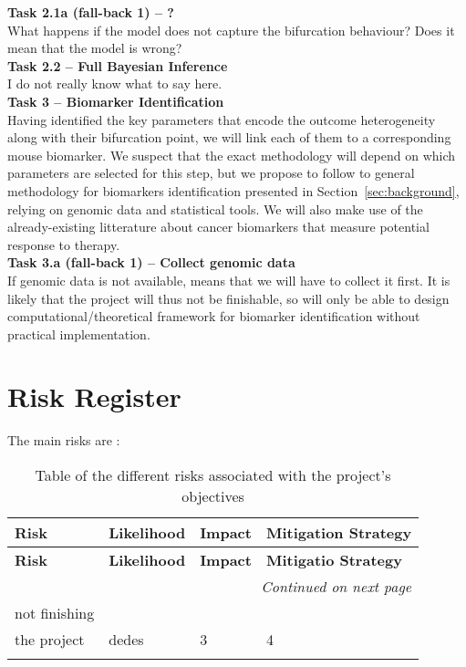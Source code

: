 \documentclass[11pt]{article}
\begin{document}
%
\noindent\textbf{Task 2.1a (fall-back 1) -- ?}\\ 
What happens if the model does not capture the bifurcation behaviour? Does it mean that the model is wrong? \\[12pt]
%
\noindent\textbf{Task 2.2 -- Full Bayesian Inference}\\ 
I do not really know what to say here.\\[12pt]
%
\noindent\textbf{Task 3 -- Biomarker Identification}\\ 
Having identified the key parameters that encode the outcome heterogeneity along with their bifurcation point, we will link each of them to a corresponding mouse biomarker. We suspect that the exact methodology will depend on which parameters are selected for this step, but we propose to follow to general methodology for biomarkers identification presented in Section~\ref{sec:background}, relying on genomic data and statistical tools. We will also make use of the already-existing litterature about cancer biomarkers that measure potential response to therapy. \\[11pt]
%
\noindent\textbf{Task 3.a (fall-back 1) -- Collect genomic data}\\ 
If genomic data is not available, means that we will have to collect it first. It is likely that the project will thus not be finishable, so will only be able to design computational/theoretical framework for biomarker identification without practical implementation.  

\section{Risk Register}
The main risks are : 

\begin{longtable}{|p{3.5cm}|p{2.5cm}|p{4.5cm}|p{5cm}|}
    \hline
    \textbf{Risk} & \textbf{Likelihood} & \textbf{Impact} & \textbf{Mitigation Strategy}\\
    \hline
    \endfirsthead
    \hline
    \textbf{Risk} & \textbf{Likelihood} & \textbf{Impact} & \textbf{Mitigatio Strategy}\\
    \hline
    \endhead
    \hline
    \multicolumn{4}{|r|}{\textit{Continued on next page}} \\
    \hline
    \endfoot
    \hline
\endlastfoot
        \hline
        not finishing \\ the project & dedes & 3 & 4 \\ \hline 
    \caption{Table of the different risks associated with the project's objectives}
    \label{tbl:hyperparams}
\end{longtable}
\end{document}
